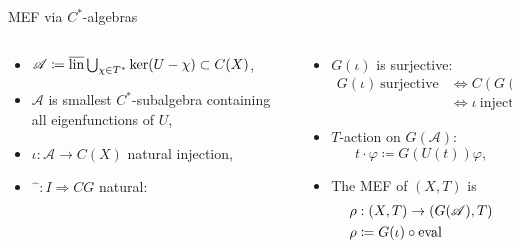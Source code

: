\begin{frame}[fragile]{MEF via $C^*$-algebras}
  \begin{columns}[t]
    \begin{column}{0.5\textwidth}
     \begin{itemize}
       \item $\mathscr{A}\coloneq \overline{\operatorname{lin}} \bigcup_{\chi \in T^*} \ker (U- \chi) \subset C(X)$,
    \item  $\mathscr{A}$ is smallest $C^*$-subalgebra containing all eigenfunctions of $U$,
    \item $\iota : \mathscr{A} \to C(X)$ natural injection,
      \pause
    \item $\widehat{\phantom{a}}: I \Rightarrow CG$ natural:
     \end{itemize}
    \end{column}
    \begin{column}{0.5 \textwidth}
 \begin{itemize}
     \pause
   \item $G(\iota)$ is surjective:
  \begin{equation*}
        \begin{split}
          G(\iota) \ \text{surjective} &\Leftrightarrow C (G( \iota )) \ \text{injective} \\
          &\Leftrightarrow \iota \ \text{injective}
        \end{split}
              \end{equation*}
              \pause
   \item $T$-action on $G(\mathscr{A})$:
      \begin{equation*}
      t\cdot \varphi \coloneq G(U(t))\varphi,
      \end{equation*}
    \item The MEF of $(X,T)$ is
      \begin{equation*}
        \begin{split}
          &\rho : (X,T) \to (G(\mathscr{A}),T)\\ 
          &\rho\coloneq G(\iota) \circ \operatorname{eval}
        \end{split}
      \end{equation*}
   \end{itemize}
    \end{column}
  \end{columns}
  \end{frame}
